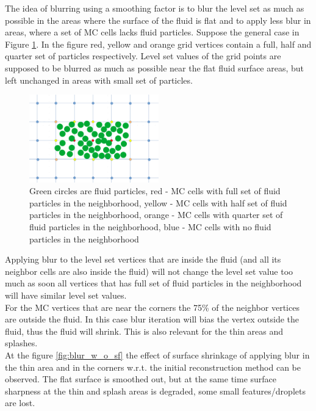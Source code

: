 The idea of blurring using a smoothing factor is to blur the level set as much as possible in the areas where the surface of the fluid is flat and to apply less blur in areas, where a set of MC cells lacks fluid particles. Suppose the general case in Figure \ref{fig:sf_example}. In the figure red, yellow and orange grid vertices contain a full, half and quarter set of particles respectively. Level set values of the grid points are supposed to be blurred as much as possible near the flat fluid surface areas, but left unchanged in areas with small set of particles.
\begin{figure}[H]
	\begin{center}
		\includegraphics[width=0.5\textwidth]{figures/SmoothingFactorPictureExplenation.png}		
		\caption{Green circles are fluid particles, red - MC cells with full set of fluid particles in the neighborhood, yellow -  MC cells with half set of fluid particles in the neighborhood, orange - MC cells with quarter set of fluid particles in the neighborhood, blue - MC cells with no fluid particles in the neighborhood}
		\label{fig:sf_example}
	\end{center}
\end{figure}
Applying blur to the level set vertices that are inside the fluid (and all its neighbor cells are also inside the fluid) will not change the level set value too much as soon all vertices that has full set of fluid particles in the neighborhood will have similar level set values.\\
For the MC vertices that are near the corners the 75\% of the neighbor vertices are outside the fluid. In this case blur iteration will bias the vertex outside the fluid, thus the fluid will shrink. This is also relevant for the thin areas and splashes.\\
At the figure \ref{fig:blur_w_o_sf} the effect of surface shrinkage of applying blur in the thin area and in the corners w.r.t. the initial reconstruction method can be observed. The flat surface is smoothed out, but at the same time surface sharpness at the thin and splash areas is degraded, some small features/droplets are lost.
